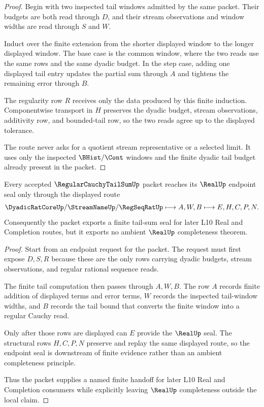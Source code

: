 \begin{proof}
Begin with two inspected tail windows admitted by the same packet. Their budgets are both read through $D$, and their stream observations and window widths are read through $S$ and $W$.

Induct over the finite extension from the shorter displayed window to the longer displayed window. The base case is the common window, where the two reads use the same rows and the same dyadic budget. In the step case, adding one displayed tail entry updates the partial sum through $A$ and tightens the remaining error through $B$.

The regularity row $R$ receives only the data produced by this finite induction. Componentwise transport in $H$ preserves the dyadic budget, stream observations, additivity row, and bounded-tail row, so the two reads agree up to the displayed tolerance.

The route never asks for a quotient stream representative or a selected limit. It uses only the inspected $\BHist/\Cont$ windows and the finite dyadic tail budget already present in the packet.
\end{proof}

\begin{theorem}
\label{thm:regular-cauchy-tail-sum-real-seal}
Every accepted $\RegularCauchyTailSumUp$ packet reaches its $\RealUp$ endpoint seal only through the displayed route
$$
\DyadicRatCoreUp/\StreamNameUp/\RegSeqRatUp
\longmapsto A,W,B
\longmapsto E,H,C,P,N .
$$
Consequently the packet exports a finite tail-sum seal for later L10 Real and Completion routes, but it exports no ambient $\RealUp$ completeness theorem.
\end{theorem}

\begin{proof}
Start from an endpoint request for the packet. The request must first expose $D,S,R$ because these are the only rows carrying dyadic budgets, stream observations, and regular rational sequence reads.

The finite tail computation then passes through $A,W,B$. The row $A$ records finite addition of displayed terms and error terms, $W$ records the inspected tail-window widths, and $B$ records the tail bound that converts the finite window into a regular Cauchy read.

Only after those rows are displayed can $E$ provide the $\RealUp$ seal. The structural rows $H,C,P,N$ preserve and replay the same displayed route, so the endpoint seal is downstream of finite evidence rather than an ambient completeness principle.

Thus the packet supplies a named finite handoff for later L10 Real and Completion consumers while explicitly leaving $\RealUp$ completeness outside the local claim.
\end{proof}

